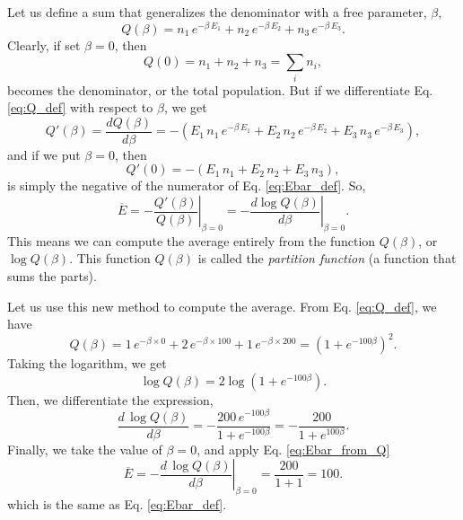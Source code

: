 \documentclass{article}
\begin{document}
Let us define a sum that generalizes the denominator with a free parameter, $\beta$,
\begin{equation}
  Q(\beta) = n_1 \, e^{-\beta \, E_1} + n_2 \, e^{-\beta \, E_2} + n_3 \, e^{-\beta \, E_3}
  .
  \label{eq:Q_def}
\end{equation}
%
Clearly, if set $\beta = 0$, then
$$
Q(0) = n_1 + n_2 + n_3 = \sum_i n_i,
$$
becomes the denominator, or the total population.
%
But if we differentiate Eq. \eqref{eq:Q_def} with respect to $\beta$,
we get
%
\begin{equation}
  Q'(\beta) = \frac{ d Q(\beta) } { d\beta }
  = -( E_1 \, n_1 \, e^{-\beta \, E_1}
    +  E_2 \, n_2 \, e^{-\beta \, E_2}
    +  E_3 \, n_3 \, e^{-\beta \, E_3} )
  ,
  \label{eq:dQ}
\end{equation}
and if we put $\beta = 0$, then
$$
  Q'(0) = - (E_1 \, n_1 + E_2 \, n_2 + E_3 \, n_3),
$$
is simply the negative of the numerator of Eq. \eqref{eq:Ebar_def}.
%
So,
\begin{equation}
\overline E = -\left. \frac{Q'(\beta)}{Q(\beta)} \right|_{\beta = 0}
  = -\left. \frac{ d \log Q(\beta) } { d\beta } \right|_{\beta = 0 }
.
  \label{eq:Ebar_from_Q}
\end{equation}
%
This means we can compute the average entirely from the function $Q(\beta)$,
or $\log Q(\beta)$.
%
This function $Q(\beta)$ is called the \emph{partition function}
(a function that sums the parts).

Let us use this new method to compute the average.
From Eq. \eqref{eq:Q_def}, we have
$$
Q(\beta) = 1 \, e^{-\beta \times 0 } + 2 \, e^{-\beta \times 100 } + 1 \, e^{-\beta \times 200}
= (1 + e^{-100 \beta})^2.
$$
Taking the logarithm, we get
$$
\log Q(\beta) = 2 \log(1 + e^{-100 \beta}).
$$
Then, we differentiate the expression,
%
\begin{equation}
\frac{ d \, \log Q(\beta) } { d\beta }
= - \frac{200 \, e^{-100 \beta} }{ 1 + e^{-100 \beta} }
= - \frac{200 }{ 1 + e^{100 \beta} }
.
\label{eq:dQ_ex1}
\end{equation}
%
Finally, we take the value of $\beta = 0$, and apply Eq. \eqref{eq:Ebar_from_Q}
$$
\overline E = 
-\left. \frac{ d \, \log Q(\beta) } { d\beta } \right|_{\beta = 0}
= \frac{200}{1 + 1} = 100
.
$$
which is the same as Eq. \eqref{eq:Ebar_def}.
\end{document}

